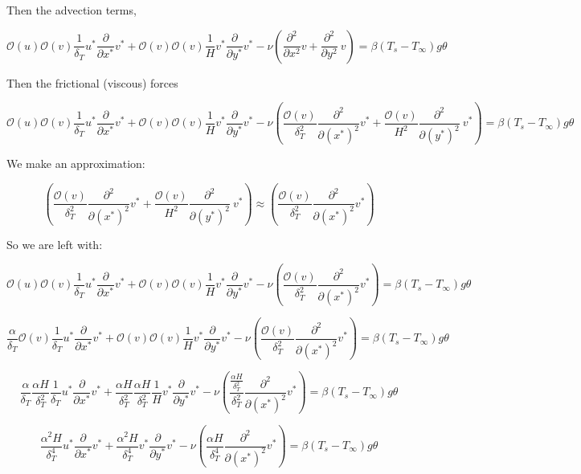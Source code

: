 \documentclass[11pt]{article}
\begin{document}
Then the advection terms,

$$ \mathcal{O}(u) \mathcal{O}(v) \frac{1}{\delta_T} u^* \frac{\partial}{\partial x^*} v^* +  \mathcal{O}(v) \mathcal{O}(v) \frac{1}{H} v^* \frac{\partial}{\partial y^*} v^*  -\nu ( \frac{\partial^2}{\partial x^2} v + \frac{\partial^2}{\partial y^2} \ v ) = \beta(T_s-T_\infty) g \theta $$

Then the frictional (viscous) forces

$$  \mathcal{O}(u) \mathcal{O}(v) \frac{1}{\delta_T} u^* \frac{\partial}{\partial x^*} v^* +  \mathcal{O}(v) \mathcal{O}(v) \frac{1}{H} v^* \frac{\partial}{\partial y^*} v^*  -\nu ( \frac{\mathcal{O}(v)}{\delta_T^2} \frac{\partial^2}{\partial (x^*)^2} v^* + \frac{\mathcal{O}(v)}{H^2} \frac{\partial^2}{\partial (y^*)^2} \ v^* ) = \beta(T_s-T_\infty) g \theta $$

We make an approximation:

$$( \frac{\mathcal{O}(v)}{\delta_T^2} \frac{\partial^2}{\partial (x^*)^2} v^* + \frac{\mathcal{O}(v)}{H^2} \frac{\partial^2}{\partial (y^*)^2} \ v^* ) \approx ( \frac{\mathcal{O}(v)}{\delta_T^2} \frac{\partial^2}{\partial (x^*)^2} v^* )$$

So we are left with:

$$  \mathcal{O}(u) \mathcal{O}(v) \frac{1}{\delta_T} u^* \frac{\partial}{\partial x^*} v^* + \mathcal{O}(v) \mathcal{O}(v) \frac{1}{H} v^* \frac{\partial}{\partial y^*} v^*  -\nu ( \frac{\mathcal{O}(v)}{\delta_T^2} \frac{\partial^2}{\partial (x^*)^2} v^* ) = \beta(T_s-T_\infty) g \theta $$

$$ \frac{\alpha}{\delta_T} \mathcal{O}(v) \frac{1}{\delta_T} u^* \frac{\partial}{\partial x^*} v^* + \mathcal{O}(v) \mathcal{O}(v) \frac{1}{H} v^* \frac{\partial}{\partial y^*} v^*  -\nu ( \frac{\mathcal{O}(v)}{\delta_T^2} \frac{\partial^2}{\partial (x^*)^2} v^* ) = \beta(T_s-T_\infty) g \theta $$


$$ \frac{\alpha}{\delta_T}\frac{\alpha H}{\delta_T^2}\frac{1}{\delta_T} u^* \frac{\partial}{\partial x^*} v^* + \frac{\alpha H}{\delta_T^2} \frac{\alpha H}{\delta_T^2} \frac{1}{H} v^* \frac{\partial}{\partial y^*} v^*  -\nu ( \frac{\frac{\alpha H}{\delta_T^2}}{\delta_T^2} \frac{\partial^2}{\partial (x^*)^2} v^* ) = \beta(T_s-T_\infty) g \theta $$

$$ \frac{\alpha^2 H}{\delta_T^4} u^* \frac{\partial}{\partial x^*} v^* + \frac{\alpha^2 H}{\delta_T^4} v^* \frac{\partial}{\partial y^*} v^*  -\nu ( \frac{\alpha H}{\delta_T^4} \frac{\partial^2}{\partial (x^*)^2} v^* ) = \beta(T_s-T_\infty) g \theta $$
\end{document}
